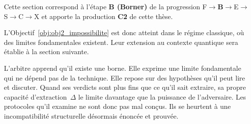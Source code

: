 \begin{sloppypar}
Cette section correspond \`a l'\'etape \textbf{B (Borner)} de la progression
F$\to$\textbf{B}$\to$E$\to$S$\to$C$\to$X et apporte la production \textbf{C2} de cette th\`ese.

L'Objectif~\ref{obj:obj2_impossibilite} est donc atteint dans le r\'egime classique, o\`u des
limites fondamentales existent. Leur extension
au contexte quantique sera \'etablie \`a la section suivante.
\end{sloppypar}
\begin{boiteArbitre}
L'arbitre apprend qu'il existe une borne. Elle exprime une limite fondamentale qui ne d\'epend pas de la technique. Elle repose sur des hypoth\`eses qu'il peut lire et discuter.
Quand ses verdicts sont plus fins que ce qu'il sait extraire, sa propre capacit\'e d'extraction~$\Delta$ le limite davantage que la puissance
de l'adversaire. Les protocoles qu'il examine ne sont donc pas mal con\c{c}us.
Ils se heurtent \`a une incompatibilit\'e structurelle d\'esormais \'enonc\'ee
et prouv\'ee.
\end{boiteArbitre}

